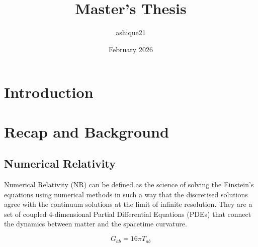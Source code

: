 \documentclass[11pt]{article}
\title{\textbf{Master's Thesis}}
\author{ashique21}
\date{February 2026}
\begin{document}
\maketitle

\vspace{-1em} %

\section{Introduction}


\section{Recap and Background}

\subsection{Numerical Relativity}

Numerical Relativity (NR) can be defined as the science of solving the Einstein's equations using numerical methods in such a way that the discretised solutions agree with the continuum solutions at the limit of infinite resolution. They are a set of coupled 4-dimensional Partial Differential Equations (PDEs) that connect the dynamics between matter and the spacetime curvature.

$$
G_{ab}=16 \pi T_{ab}
$$
\end{document}
